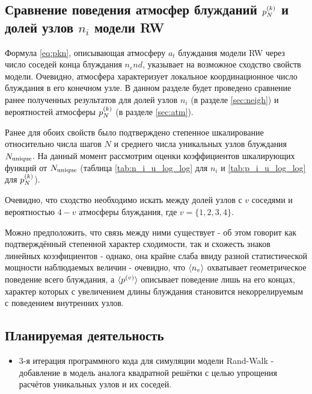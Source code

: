 \newpage

\subsection{Сравнение поведения атмосфер блужданий $p^{(k)}_N$ и долей узлов $n_i$ модели RW}

Формула \eqref{eq:pkn}, описывающая атмосферу $a_t$ блуждания модели RW через число соседей конца блуждания $n_end$, указывает на возможное сходство свойств модели.
Очевидно, атмосфера характеризует локальное координационное число блуждания в его конечном узле. 
В данном разделе будет проведено сравнение ранее полученных результатов для долей узлов $n_i$ (в разделе \ref{sec:neigh}) и вероятностей атмосферы $p^{(k)}_N$ (в разделе \ref{sec:atm}). 

Ранее для обоих свойств было подтверждено степенное шкалирование относительно числа шагов $N$ и среднего числа уникальных узлов блуждания $N_{\textup{unique}}$.
На данный момент рассмотрим оценки коэффициентов шкалирующих функций от $N_{\textup{unique}}$ (таблица \ref{tab:n_i_u_log_log} для $n_i$ и \ref{tab:p_i_u_log_log} для $p^{(k)}_N$).

Очевидно, что сходство необходимо искать между долей узлов с $v$ соседями и вероятностью $4-v$ атмосферы блуждания, где $v=\{1,2,3,4\}$. 


Можно предположить, что связь между ними существует - об этом говорит как подтверждённый степенной характер сходимости, так и схожесть знаков линейных коээфициентов - однако, она крайне слаба ввиду разной статистической мощности наблюдаемых величин - очевидно, что $\langle n_v \rangle$ охватывает геометрическое поведение всего блуждания, а $\langle p^{(v)} \rangle$ описывает поведение лишь на его концах, характер которых с увеличением длины блуждания становится некоррелируемым с поведением внутренних узлов.

\newpage

\subsection{Планируемая деятельность}

\begin{itemize}
\item 3-я итерация программного кода для симуляции модели Rand-Walk - добавление в модель аналога квадратной решётки с целью упрощения расчётов уникальных узлов и их соседей.
\end{itemize}
